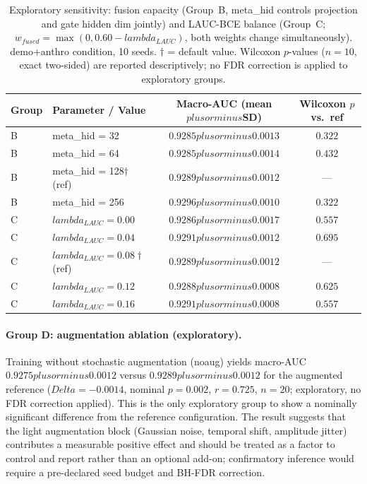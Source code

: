 \documentclass[mathematics,article,pdftex]{Definitions/mdpi}
\def\texttt#1{#1}%
\def\mathrm#1{#1}%
\def\textbf#1{#1}%
\def\Delta{Delta }%
\def\pm{plus or minus }%
\def\lambda{lambda }%
\begin{document}
\begin{table}[H]
\caption{Exploratory sensitivity: fusion capacity (Group~B, \texttt{meta\_hid} controls projection and gate hidden dim jointly) and LAUC-BCE balance (Group~C; $w_{\mathrm{fused}} = \max(0,0.60-\lambda_{\mathrm{LAUC}})$, both weights change simultaneously). \texttt{demo+anthro} condition, 10 seeds. $\dagger$ = default value. Wilcoxon $p$-values ($n{=}10$, exact two-sided) are reported descriptively; no FDR correction is applied to exploratory groups.}\label{tab:sensitivity}
\small\centering
\begin{tabular}{llcc}
\toprule
\textbf{Group} & \textbf{Parameter / Value} & \textbf{Macro-AUC (mean$\pm$SD)} & \textbf{Wilcoxon $p$ vs.\ ref} \\
\midrule
B & \texttt{meta\_hid} = 32  & $0.9285\pm0.0013$ & $0.322$ \\
B & \texttt{meta\_hid} = 64  & $0.9285\pm0.0014$ & $0.432$ \\
B & \texttt{meta\_hid} = 128$\dagger$ (ref) & $0.9289\pm0.0012$ & --- \\
B & \texttt{meta\_hid} = 256 & $0.9296\pm0.0010$ & $0.322$ \\
\midrule
C & $\lambda_{\mathrm{LAUC}} = 0.00$ & $0.9286\pm0.0017$ & $0.557$ \\
C & $\lambda_{\mathrm{LAUC}} = 0.04$ & $0.9291\pm0.0012$ & $0.695$ \\
C & $\lambda_{\mathrm{LAUC}} = 0.08\dagger$ (ref) & $0.9289\pm0.0012$ & --- \\
C & $\lambda_{\mathrm{LAUC}} = 0.12$ & $0.9288\pm0.0008$ & $0.625$ \\
C & $\lambda_{\mathrm{LAUC}} = 0.16$ & $0.9291\pm0.0008$ & $0.557$ \\
\bottomrule
\end{tabular}
\end{table}

\paragraph{Group D: augmentation ablation (exploratory).}
Training without stochastic augmentation (\texttt{noaug}) yields macro-AUC $0.9275{\pm}0.0012$ versus $0.9289{\pm}0.0012$ for the augmented reference ($\Delta{=}{-}0.0014$, nominal $p{=}0.002$, $r{=}0.725$, $n{=}20$; exploratory, no FDR correction applied). This is the only exploratory group to show a nominally significant difference from the reference configuration. The result suggests that the light augmentation block (Gaussian noise, temporal shift, amplitude jitter) contributes a measurable positive effect and should be treated as a factor to control and report rather than an optional add-on; confirmatory inference would require a pre-declared seed budget and BH-FDR correction.
\end{document}
